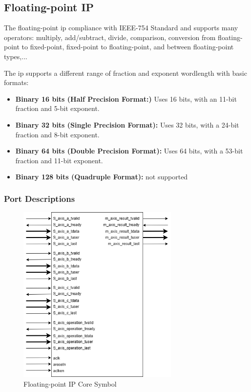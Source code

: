 \documentclass[a4paper, 12pt]{report}
\begin{document}
\subsection{Floating-point IP}

The floating-point ip compliance with IEEE-754 Standard and supports many operators: multiply, add/subtract, divide, comparison, conversion from floating-point to fixed-point, fixed-point to floating-point, and between floating-point types,...

The ip supports a different range of fraction and exponent wordlength with basic formats:
\begin{itemize}
    \item \textbf{Binary 16 bits (Half Precision Format:)} Uses 16 bits, with an 11-bit fraction and 5-bit exponent.
    \item \textbf{Binary 32 bits (Single Precision Format):} Uses 32 bits, with a 24-bit fraction and 8-bit exponent. 
    \item \textbf{Binary 64 bits (Double Precision Format):} Uses 64 bits, with a 53-bit fraction and 11-bit exponent. 
    \item \textbf{Binary 128 bits (Quadruple Format):} not supported
\end{itemize}
\subsubsection{Port Descriptions}
\begin{figure}[H]
    \centering
    \includegraphics[width = 8cm]{picture/IP Catalog/floating/ip-Page-1.drawio.png}
    \caption{Floating-point IP Core Symbol}
    \medskip
\end{figure}
\end{document}
